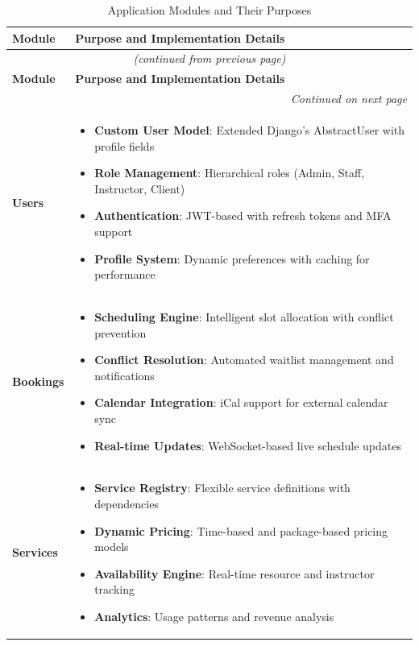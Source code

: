 \begin{center}
\begin{longtable}{p{}p{}}
    \caption{Application Modules and Their Purposes} \\
    \toprule
    \rowcolor{primary!10}\textbf{Module} & \textbf{Purpose and Implementation Details} \\
    \midrule
    \endfirsthead
    
    \multicolumn{2}{c}{\textit{(continued from previous page)}} \\
    \toprule
    \rowcolor{primary!10}\textbf{Module} & \textbf{Purpose and Implementation Details} \\
    \midrule
    \endhead
    
    \bottomrule
    \multicolumn{2}{r}{\textit{Continued on next page}} \\
    \endfoot
    
    \bottomrule
    \endlastfoot
    
    \textbf{Users} & 
    \begin{itemize}[leftmargin=*]
        \item \textbf{Custom User Model}: Extended Django's AbstractUser with profile fields
        \item \textbf{Role Management}: Hierarchical roles (Admin, Staff, Instructor, Client)
        \item \textbf{Authentication}: JWT-based with refresh tokens and MFA support
        \item \textbf{Profile System}: Dynamic preferences with caching for performance
    \end{itemize} \\
    \midrule
    
    \textbf{Bookings} & 
    \begin{itemize}[leftmargin=*]
        \item \textbf{Scheduling Engine}: Intelligent slot allocation with conflict prevention
        \item \textbf{Conflict Resolution}: Automated waitlist management and notifications
        \item \textbf{Calendar Integration}: iCal support for external calendar sync
        \item \textbf{Real-time Updates}: WebSocket-based live schedule updates
    \end{itemize} \\
    \midrule
    
    \textbf{Services} & 
    \begin{itemize}[leftmargin=*]
        \item \textbf{Service Registry}: Flexible service definitions with dependencies
        \item \textbf{Dynamic Pricing}: Time-based and package-based pricing models
        \item \textbf{Availability Engine}: Real-time resource and instructor tracking
        \item \textbf{Analytics}: Usage patterns and revenue analysis
    \end{itemize} \\
    \midrule
    

\end{longtable}
\end{center}
